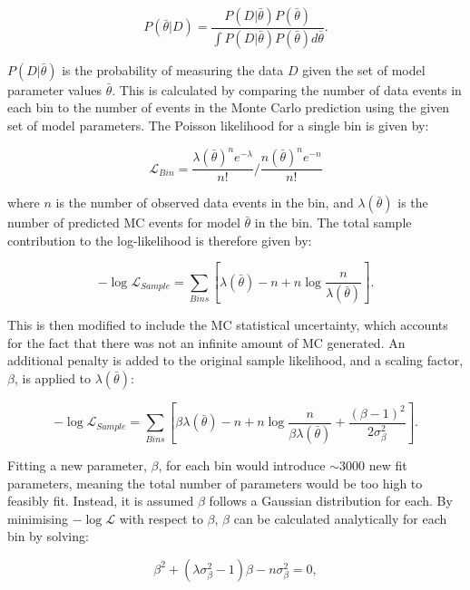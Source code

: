\begin{equation}
P(\bar{\theta}|D) = \frac{P(D|\bar{\theta}) P(\bar{\theta})}{\int P(D|\bar{\theta}) P(\bar{\theta}) d\bar{\theta}}.
\label{eqn:bayes}
\end{equation}

$P(D|\bar{\theta})$ is the probability of measuring the data $D$ given the set of model parameter values $\bar{\theta}$. This is calculated by comparing the number of data events in each bin to the number of events in the Monte Carlo prediction using the given set of model parameters. The Poisson likelihood for a single bin is given by:

\begin{equation}
\mathcal{L}_{Bin} = \frac{\lambda(\bar{\theta}) ^n e^{-\lambda}}{n!} / \frac{n(\bar{\theta}) ^n e^{-n}}{n!}
\end{equation}

where $n$ is the number of observed data events in the bin, and $\lambda(\bar{\theta})$ is the number of predicted MC events for model $\bar{\theta}$ in the bin. The total sample contribution to the log-likelihood is therefore given by:

\begin{equation}
-\log\mathcal{L}_{Sample} = \sum_{Bins}[\lambda(\bar{\theta}) - n + n \log \frac{n}{\lambda(\bar{\theta})}].
\label{eqn:llhsample}
\end{equation}

This is then modified to include the MC statistical uncertainty, which accounts for the fact that there was not an infinite amount of MC generated. An additional penalty is added to the original sample likelihood, and a scaling factor, $\beta$, is applied to $\lambda(\bar{\theta})$:

\begin{equation}
-\log\mathcal{L}_{Sample} = \sum_{Bins}[\beta\lambda(\bar{\theta}) - n + n \log \frac{n}{\beta\lambda(\bar{\theta})} + \frac{(\beta -1)^2}{2\sigma^{2}_\beta}].
\label{eqn:llhbb}
\end{equation}

Fitting a new parameter, $\beta$, for each bin would introduce $\sim$3000 new fit parameters, meaning the total number of parameters would be too high to feasibly fit. Instead, it is assumed $\beta$ follows a Gaussian distribution for each. By minimising $-\log\mathcal{L}$ with respect to $\beta$, $\beta$ can be calculated analytically for each bin by solving:

\begin{equation}
\beta^2 + (\lambda \sigma^{2}_{\beta} - 1)\beta - n \sigma^{2}_{\beta} = 0,
\label{eqn:bbquad}
\end{equation}

